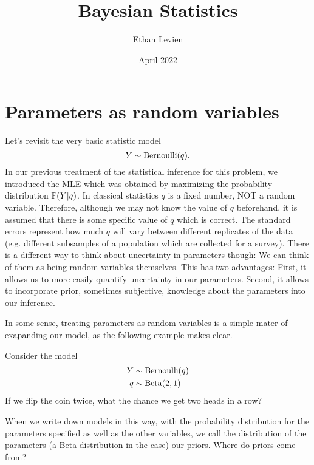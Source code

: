 

\title{\Huge \color{C1}  Bayesian Statistics}
\author{Ethan Levien}
\date{April 2022}



\maketitle

\tableofcontents





\section{Parameters as random variables}
Let's revisit the very basic statistic model
\begin{equation}
Y \sim {\rm Bernoulli}(q).
\end{equation}
In our previous treatment of the statistical inference for this problem, we introduced the MLE which was obtained by maximizing the probability distribution $\mathbb P(Y|q)$. In classical statistics $q$ is a fixed number, NOT a random variable. Therefore, although we may not know the value of $q$ beforehand, it is assumed that there is some specific value of $q$ which is correct. The standard errors represent how much $q$ will vary between different replicates of the data (e.g. different subsamples of a population which are collected for a survey). There is a different way to think about uncertainty in parameters though: We can think of them as being random variables themselves. This has two advantages: First, it allows us to more easily quantify uncertainty in our parameters. Second, it allows to incorporate prior, sometimes subjective, knowledge about the parameters into our inference.

In some sense, treating parameters as random variables is a simple mater of exapanding our model, as the following example makes clear.
\begin{example}
Consider the model
\begin{align}
Y &\sim {\rm Bernoulli}(q)\\
q &\sim {\rm Beta}(2,1)
\end{align}
If we flip the coin twice, what the chance we get two heads in a row?
\end{example}


When we write down models in this way, with the probability distribution for the parameters specified as well as the other variables, we call the distribution of the parameters (a Beta distribution in the case) our priors.  Where do priors come from?

